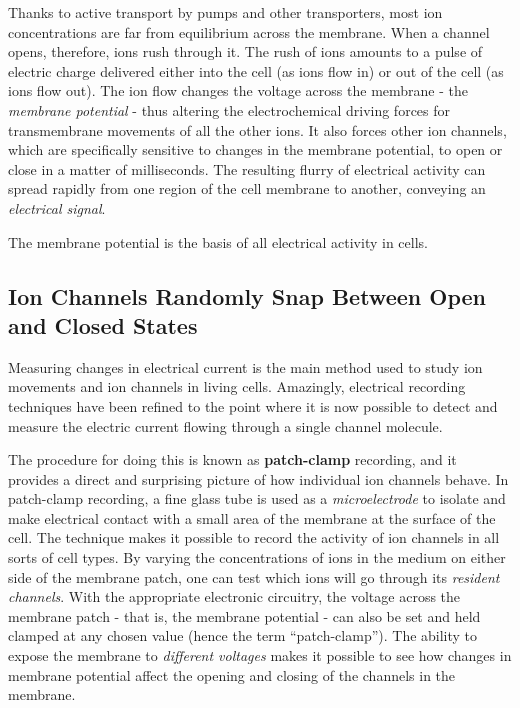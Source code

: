 Thanks to active transport by pumps and other transporters, most ion
concentrations are far from equilibrium across the membrane. When a
channel opens, therefore, ions rush through it. The rush of ions amounts
to a pulse of electric charge delivered either into the cell (as ions flow
in) or out of the cell (as ions flow out). The ion flow changes the voltage
across the membrane - the \textit{membrane potential} - thus altering the
electrochemical driving forces for transmembrane movements of all the
other ions. It also forces other ion channels, which are specifically sensitive
to changes in the membrane potential, to open or close in a matter of
milliseconds. The resulting flurry of electrical activity can spread rapidly
from one region of the cell membrane to another, conveying an \textit{electrical
signal}.

The membrane potential is the basis of all electrical activity in cells.

\subsection{Ion Channels Randomly Snap Between Open and Closed States}

Measuring changes in electrical current is the main method used to study
ion movements and ion channels in living cells. Amazingly, electrical
recording techniques have been refined to the point where it is now possible
to detect and measure the electric current flowing through a single
channel molecule.

The procedure for doing this is known as \textbf{patch-clamp}
recording, and it provides a direct and surprising picture of how individual
ion channels behave.
In patch-clamp recording, a fine glass tube is used as a \textit{microelectrode} to
isolate and make electrical contact with a small area of the membrane
at the surface of the cell. The technique makes it possible
to record the activity of ion channels in all sorts of cell types.
By varying the concentrations of ions in
the medium on either side of the membrane patch, one can test which
ions will go through its \textit{resident channels}. With the appropriate electronic
circuitry, the voltage across the membrane patch - that is, the membrane
potential - can also be set and held clamped at any chosen value (hence
the term “patch-clamp”). The ability to expose the membrane to \textit{different
voltages} makes it possible to see how changes in membrane potential
affect the opening and closing of the channels in the membrane.

